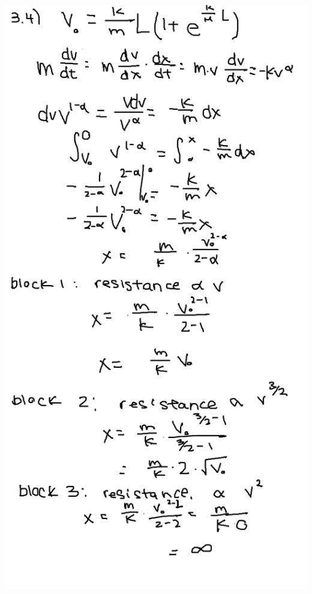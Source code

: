 \documentclass{article}
\begin{document}
\includegraphics[width=\textwidth,height=\textheight,keepaspectratio]{3-4.png}\clearpage{}
\end{document}
